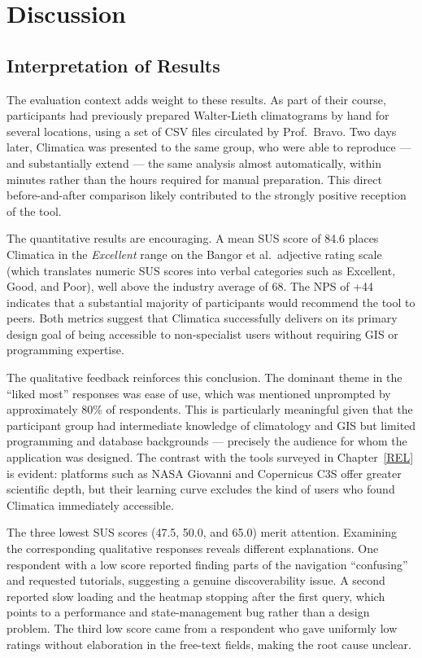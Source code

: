 \section{Discussion}\label{EVAL_DISCUSS}

\subsection{Interpretation of Results}\label{EVAL_DISCUSS_RESULTS}

The evaluation context adds weight to these results. As part of their course,
participants had previously prepared Walter-Lieth climatograms by hand for
several locations, using a set of CSV files circulated by Prof.\ Bravo. Two
days later, Climatica was presented to the same group, who were able to
reproduce --- and substantially extend --- the same analysis almost
automatically, within minutes rather than the hours required for manual
preparation. This direct before-and-after comparison likely contributed to
the strongly positive reception of the tool.

The quantitative results are encouraging. A mean SUS score of 84.6 places
Climatica in the \emph{Excellent} range on
the Bangor et al.\ adjective rating scale (which translates numeric SUS
scores into verbal categories such as Excellent, Good, and Poor), well above
the industry average of 68. The NPS of +44 indicates that a
substantial majority of participants would recommend the tool to peers. Both
metrics suggest that Climatica successfully delivers on its primary design goal
of being accessible to non-specialist users without requiring GIS or programming
expertise.

The qualitative feedback reinforces this conclusion. The dominant theme in the
``liked most'' responses was ease of use, which was mentioned unprompted by
approximately 80\% of respondents. This is particularly meaningful given that
the participant group had intermediate knowledge of climatology and GIS but
limited programming and database backgrounds --- precisely the audience for
whom the application was designed. The contrast with the tools surveyed in
Chapter~\ref{REL} is evident: platforms such as NASA Giovanni and Copernicus
C3S offer greater scientific depth, but their learning curve excludes the kind
of users who found Climatica immediately accessible.

The three lowest SUS scores (47.5, 50.0, and 65.0) merit attention. Examining
the corresponding qualitative responses reveals different explanations. One
respondent with a low score reported finding parts of the navigation
``confusing'' and requested tutorials, suggesting a genuine discoverability
issue. A second reported slow loading and the heatmap stopping after the first
query, which points to a performance and state-management bug rather than a
design problem. The third low score came from a respondent who gave uniformly
low ratings without elaboration in the free-text fields, making the root cause
unclear.

